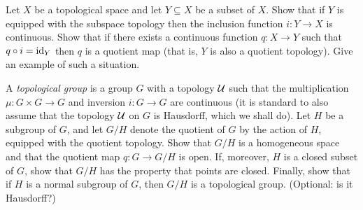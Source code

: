\begin{exercise}
  Let \(X\) be a topological space and let \(Y\subseteq X\) be a subset of
  \(X\). Show that if \(Y\) is equipped with the subspace topology then the
  inclusion function \(i\colon Y\to X\) is continuous. Show that if
  there exists a continuous function \(q\colon X\to Y\) such that
  \(q\circ i=\operatorname{id}_Y\) then \(q\) is a quotient map (that is, \(Y\) is also
  a quotient topology). Give an example of such a situation.
\end{exercise}
\begin{solution}
\end{solution}

\begin{exercise}
  A \emph{topological group} is a group \(G\) with a topology \(\mathcal{U}\)
  such that the multiplication \(\mu\colon G\times G\to G\) and inversion
  \(i\colon G\to G\) are continuous (it is standard to also assume that
  the topology \(\mathcal{U}\) on \(G\) is Hausdorff, which we shall do). Let
  \(H\) be a subgroup of \(G\), and let \(G/H\) denote the quotient of
  \(G\) by the action of \(H\), equipped with the quotient topology. Show
  that \(G/H\) is a homogeneous space and that the quotient map \(q\colon
  G\to G/H\) is open. If, moreover, \(H\) is a closed subset of \(G\), show
  that \(G/H\) has the property that points are closed. Finally, show that
  if \(H\) is a normal subgroup of \(G\), then \(G/H\) is a topological
  group. (Optional: is it Hausdorff?)
\end{exercise}
\begin{solution}
\end{solution}

